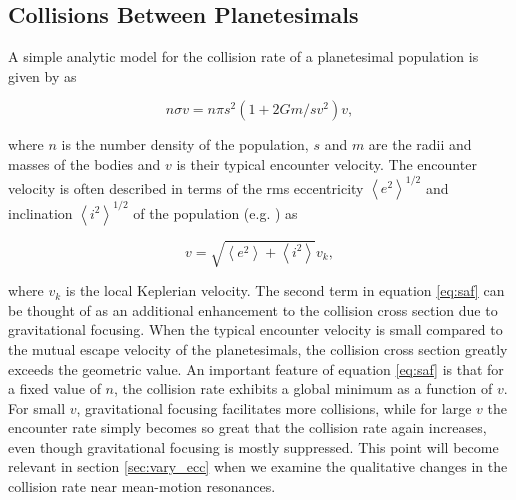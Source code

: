 \documentclass[fleqn,usenatbib]{mnras}
\begin{document}



\subsection{Collisions Between Planetesimals}\label{sec:colleq}

A simple analytic model for the collision rate of a planetesimal population is given by \citet{1969edo..book.....S} as

\begin{equation}\label{eq:saf}
	n \sigma v = n \pi s^{2} \left( 1 + 2 G m / s v^{2} \right) v,
\end{equation}

\noindent where $n$ is the number density of the population, $s$ and $m$ are the radii and masses of the bodies and $v$ is their typical encounter velocity. The encounter velocity is often described in terms of the rms eccentricity $\left<e^{2}\right>^{1/2}$ and inclination $\left<i^{2}\right>^{1/2}$ of the population (e.g. \citet{1993ARA&A..31..129L}) as

\begin{equation}\label{eq:eccincvel}
	v = \sqrt{\left< e^{2} \right> + \left< i^{2} \right>} v_{k},
\end{equation}

\noindent where $v_{k}$ is the local Keplerian velocity. The second term in equation \ref{eq:saf} can be thought of as an additional enhancement to the collision cross section due to 
gravitational focusing. When the typical encounter velocity is small compared to the mutual escape velocity of the planetesimals, the collision cross section greatly exceeds the geometric 
value. An important feature of equation \ref{eq:saf} is that for a fixed value of $n$, the collision rate exhibits a global minimum as a function of $v$. For small $v$, gravitational focusing 
facilitates more collisions, while for large $v$ the encounter rate simply becomes so great that the collision rate again increases, even though gravitational focusing is mostly suppressed. 
This point will become relevant in section \ref{sec:vary_ecc} when we examine the qualitative changes in the collision rate near mean-motion resonances.
\end{document}
